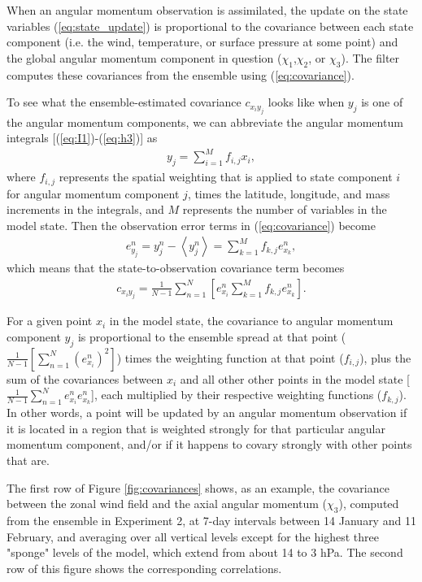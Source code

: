 When an angular momentum observation is assimilated, the update on the state variables (\ref{eq:state_update}) is proportional to the covariance between each state component (i.e. the wind, temperature, or surface pressure at some point) and the global angular momentum component in question ($\chi_1$,$\chi_2$, or $\chi_3$). 
The filter computes these covariances from the ensemble using (\ref{eq:covariance}).


To see what the ensemble-estimated covariance $c_{x_i y_j}$ looks like when $y_j$ is one of the angular momentum components, we can abbreviate the angular momentum integrals [(\ref{eq:I1})-(\ref{eq:h3})] as
%
\begin{eqnarray}
y_j = \sum_{i=1}^M f_{i,j} x_i,
\end{eqnarray}
%
where $f_{i,j}$ represents the spatial weighting that is applied to state component $i$ for angular momentum component $j$, times the latitude, longitude, and mass increments in the integrals, and $M$ represents the number of variables in the model state.
Then the observation error terms in (\ref{eq:covariance}) become
\begin{eqnarray}
	e_{y_j}^n = y_j^n - \left< y_j^n \right>
	= \sum_{k=1}^{M}f_{k,j}e_{x_k}^n,
\end{eqnarray}
which means that the state-to-observation covariance term becomes
\begin{eqnarray}
	c_{x_i y_j} = \frac{1}{N-1}
	\sum_{n=1}^{N}
	\left[
	e_{x_i}^n
	\sum_{k=1}^{M} f_{k,j}e_{x_k}^n
	\right].
	\label{eq:state_to_obs_covariance}
\end{eqnarray}

For a given point $x_i$ in the model state, the covariance to angular momentum component $y_j$ is proportional to the ensemble spread at that point ($\frac{1}{N-1}\left[\sum_{n=1}^N \left( e^n_{x_i} \right)^2 \right]$) times the weighting function at that point ($f_{i,j}$), plus the sum of the covariances between $x_i$ and all other other points in the model state [$\frac{1}{N-1}\sum_{n=1}^N e_{x_i}^n e_{x_k}^n$], each multiplied by their respective weighting functions ($f_{k,j}$). 
In other words, a point will be updated by an angular momentum observation if it is located in a region that is weighted strongly for that particular angular momentum component, and/or if it happens to covary strongly with other points that are.

The first row of Figure \ref{fig:covariances} shows, as an example, the covariance between the zonal wind field and the axial angular momentum ($\chi_3$), computed from the ensemble in Experiment 2, at 7-day intervals between 14 January and 11 February, and averaging over all vertical levels except for the highest three "sponge" levels of the model, which extend from about 14 to 3 hPa.  
The second row of this figure shows the corresponding correlations. 

